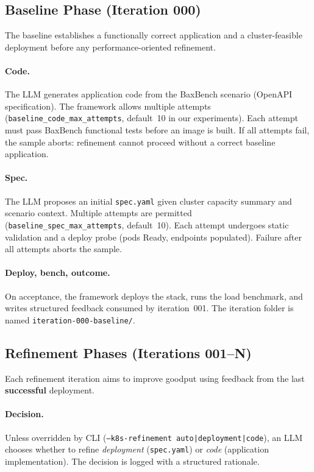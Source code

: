 \subsection{Baseline Phase (Iteration 000)}

The baseline establishes a functionally correct application and a
cluster-feasible deployment before any performance-oriented refinement.

\paragraph{Code.}
The LLM generates application code from the BaxBench scenario (OpenAPI
specification).  The framework allows multiple attempts
(\texttt{baseline\_code\_max\_attempts}, default~10 in our experiments).  Each
attempt must pass BaxBench functional tests before an image is built.  If all
attempts fail, the sample aborts: refinement cannot proceed without a correct
baseline application.

\paragraph{Spec.}
The LLM proposes an initial \texttt{spec.yaml} given cluster capacity summary
and scenario context.  Multiple attempts are permitted
(\texttt{baseline\_spec\_max\_attempts}, default~10).  Each attempt undergoes
static validation and a deploy probe (pods Ready, endpoints populated).  Failure
after all attempts aborts the sample.

\paragraph{Deploy, bench, outcome.}
On acceptance, the framework deploys the stack, runs the load benchmark, and
writes structured feedback consumed by iteration~001.  The iteration folder is
named \texttt{iteration-000-baseline/}.

\subsection{Refinement Phases (Iterations 001--N)}

Each refinement iteration aims to improve goodput using feedback from the last
\textbf{successful} deployment.

\paragraph{Decision.}
Unless overridden by CLI (\texttt{--k8s-refinement auto|deployment|code}), an
LLM chooses whether to refine \emph{deployment} (\texttt{spec.yaml}) or
\emph{code} (application implementation).  The decision is logged with a
structured rationale.

